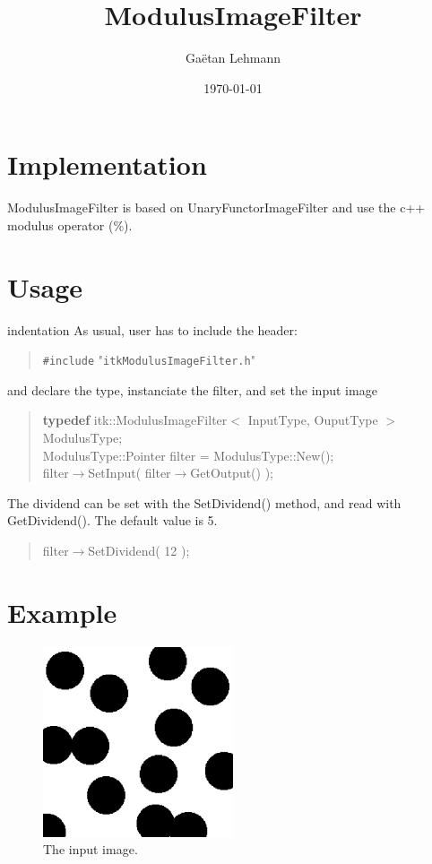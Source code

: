 \documentclass[11pt]{article}
\title{ModulusImageFilter}
\author{Ga\"etan Lehmann}
\date{\today}
\begin{document}
\maketitle


\section{Implementation}
ModulusImageFilter is based on UnaryFunctorImageFilter and use the c++ modulus operator (\%).

\section{Usage}
\expandafter\ifx\csname indentation\endcsname\relax%
\newlength{\indentation}\fi
\setlength{\indentation}{0.5em}
As usual, user has to include the header:
\begin{quote}
{\tt \#include} "{\tt{}itkModulusImageFilter.h}"\mbox{}\\
\end{quote}
and declare the type, instanciate the filter, and set the input image
\begin{quote}
{\bf typedef} itk::ModulusImageFilter$<$ InputType, OuputType $>$ ModulusType;\mbox{}\\
ModulusType::Pointer filter = ModulusType::New();\mbox{}\\
filter$\rightarrow$SetInput( filter$\rightarrow$GetOutput() );\mbox{}\\
\end{quote}

The dividend can be set with the SetDividend() method, and read with GetDividend(). The default value is 5.

\begin{quote}
filter$\rightarrow$SetDividend( 12 );\mbox{}\\
\end{quote}

\section{Example}
\begin{figure}
\centering
\includegraphics[width=0.5\textwidth]{Spots.eps}
\caption{The input image.}
\end{figure}
\end{document}
